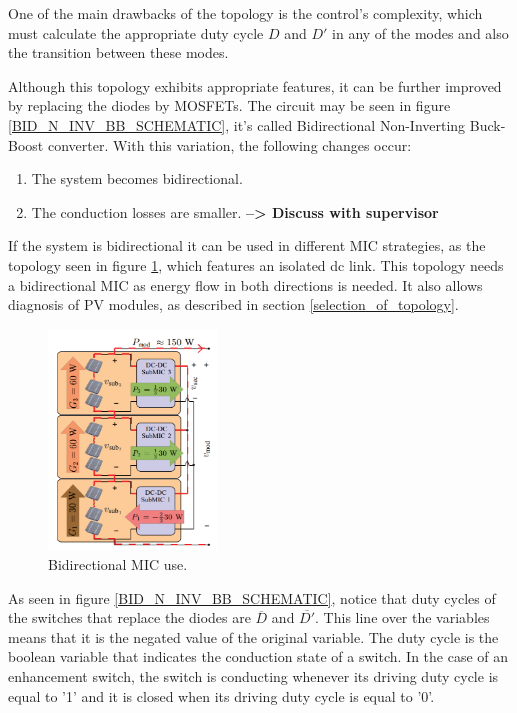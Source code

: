 One of the main drawbacks of the topology is the control's complexity, which must calculate the appropriate duty cycle $D$ and $D'$ in any of the modes and also the transition between these modes. 
		
Although this topology exhibits appropriate features, it can be further improved by replacing the diodes by MOSFETs. The circuit may be seen in figure \ref{BID_N_INV_BB_SCHEMATIC}, it's called Bidirectional Non-Inverting Buck-Boost converter. With this variation, the following changes occur:
		
\begin{enumerate}
	\item The system becomes bidirectional.
	\item The conduction losses are smaller. \textbf{--> Discuss with supervisor}
\end{enumerate}
	
If the system is bidirectional it can be used in different MIC strategies, as the topology seen in figure \ref{BID_MIC_ARCHITECTURES}, which features an isolated dc link. This topology needs a bidirectional MIC as energy flow in both directions is needed. It also allows diagnosis of PV modules, as described in section \ref{selection_of_topology}.

\begin{figure}[htbp]
	\begin{center}
		\includegraphics[width=0.4\textwidth]{../Pictures/bidirectional_mic_use}
		\caption{Bidirectional MIC use.}
		\label{BID_MIC_ARCHITECTURES}
	\end{center}	
\end{figure}
		
		
As seen in figure \ref{BID_N_INV_BB_SCHEMATIC}, notice that duty cycles of the switches that replace the diodes are $\overline{D}$ and $\overline{D'}$. This line over the variables means that it is the negated value of the original variable. The duty cycle is the boolean variable that indicates the conduction state of a switch. In the case of an enhancement switch, the switch is conducting whenever its driving duty cycle is equal to '1' and it is closed when its driving duty cycle is equal to '0'. 
		
